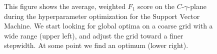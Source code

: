 \begin{figure}[H]
\hfill
{}
\hfill
{}
\hfill
\caption[Hyperparameter optimization for the Support Vector Machine (SVM)]{This figure shows the average, weighted $F_1$ score on the $C$-$\gamma$-plane during the hyperparameter optimization for the Support Vector Machine. We start looking for global optima on a coarse grid with a wide range (upper left), and adjust the grid toward a finer stepwidth. At some point we find an optimum (lower right).}
\label{fig:gridsearch-svm}
\end{figure}


